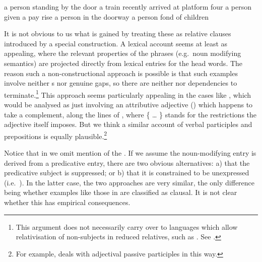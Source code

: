 \documentclass[output=paper,biblatex,babelshorthands,newtxmath,draftmode,colorlinks,citecolor=brown]{langscibook}
\begin{document}
\begin{exe}\ex\begin{xlist}\label{x:rc-99}
  \settowidth{}
  \ex\label{x:rc-100} a person standing by the door 
  \ex\label{x:rc-101} a train recently arrived at platform four 
  \ex\label{x:rc-102} a person given a pay rise 
  \ex\label{x:rc-103} a person in the doorway
  \ex\label{x:rc-104} a person fond of children
\end{xlist}\end{exe}

\noindent
It is not obvious to us what is gained by treating these as relative clauses introduced by
a special construction. A lexical account seems at least as appealing, where the relevant
properties of the phrases (e.g.\ noun modifying semantics) are projected directly from
lexical entries for the head words. The reason such a non-constructional approach is
possible is that such examples involve neither s nor genuine gaps, so
there are neither  nor  dependencies to terminate.\footnote{This
  argument does not necessarily carry over to languages which allow relativisation of
  non-subjects in reduced relatives, such as . See .
}
This
approach seems particularly appealing in the cases like , which would be
analysed as just involving an attributive adjective () which happens to take a
complement, along the lines of , where \{ \ldots{} \} stands for the restrictions
the adjective itself imposes. But we think a similar account of verbal
participles and prepositions is equally plausible.\footnote{For example, \citet[159--164]{Mueller2002b} deals with
adjectival passive participles in this way.}

\begin{exe}\ex\label{x:rc-105}
\end{exe}

\largerpage[-1]
\noindent
Notice that in  we omit mention of the . If we assume the
noun-modifying entry is derived from a predicative entry, there are two obvious
alternatives: a) that the predicative subject is suppressed; or b) that it is constrained
to be unexpressed (i.e.\ ). In the latter case, the two approaches are very
similar, the only difference being whether examples like those in  are
classified as clausal. It is not clear whether this has empirical consequences.
\end{document}

